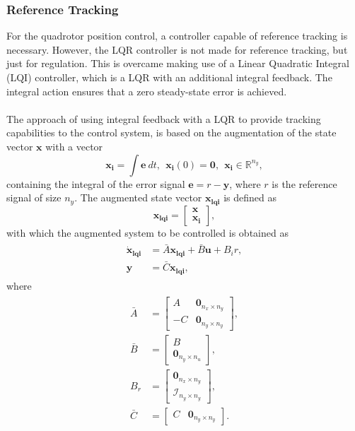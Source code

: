 \subsubsection{Reference Tracking}
For the quadrotor position control, a controller capable of reference tracking is necessary. However, the LQR controller is not made for reference tracking, but just for regulation. This is overcame making use of a Linear Quadratic Integral (LQI) controller, which is a LQR with an additional integral feedback. The integral action ensures that a zero steady-state error is achieved. 
\\\\
The approach of using integral feedback with a LQR to provide tracking capabilities to the control system, is based on the augmentation of the state vector $\mathbf{x}$ with a vector
\begin{equation}
\mathbf{x_i} = \int \mathbf{e}\ dt,\ \ \mathbf{x_i}(0) = \mathbf{0},\ \ \mathbf{x_i} \in \mathbb{R}^{n_y},
\end{equation}
containing the integral of the error signal $\mathbf{e} = r - \mathbf{y}$, where $r$ is the reference signal of size $n_y$. The augmented state vector $\mathbf{x_{lqi}}$ is defined as
\begin{equation}
\mathbf{x_{lqi}} = \begin{bmatrix}
\mathbf{x} \\
\mathbf{x_i}
\end{bmatrix},
\end{equation}
with which the augmented system to be controlled is obtained as
\begin{align}
\label{eqn:augmentedLQI}
\begin{split}
\mathbf{\dot{x}_{lqi}} & = \bar{A}\mathbf{x_{lqi}} + \bar{B}\mathbf{u} + B_{i}r,\\[5px]
\mathbf{y} & = \bar{C}\mathbf{x_{lqi}},
\end{split}
\end{align}
where
\begin{align}
\begin{split}
\bar{A} & = \begin{bmatrix}
A & \mathbf{0_{\mathit{n_x}\times \mathit{n_y}}} \\
-C & \mathbf{0_{\mathit{n_y}\times \mathit{n_y}}}
\end{bmatrix}, \\[5px]
\bar{B} & = \begin{bmatrix}
B \\ \mathbf{0_{\mathit{n_y}\times \mathit{n_u}}}
\end{bmatrix}, \\[5px]
B_{r} & = \begin{bmatrix}
\mathbf{0_{\mathit{n_x}\times \mathit{n_y}}} \\
\mathcal{I}_{\mathit{n_y}\times \mathit{n_y}}
\end{bmatrix}, \\[5px]
\bar{C} & = \begin{bmatrix}
C & \mathbf{0_{\mathit{n_y}\times \mathit{n_y}}}
\end{bmatrix}.
\end{split}
\end{align}
